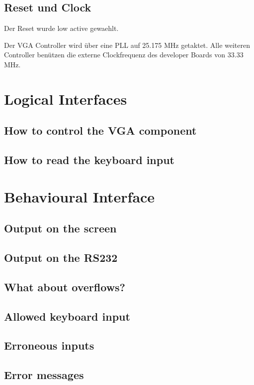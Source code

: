 \documentclass[a4paper,10pt]{scrreprt}
\begin{document}
\subsection{Reset und Clock}
Der Reset wurde low active gewaehlt.

Der VGA Controller wird über eine PLL auf 25.175 MHz getaktet. 
Alle weiteren Controller benützen die externe Clockfrequenz
des developer Boards von 33.33 MHz.

\section{Logical Interfaces}
\subsection{How to control the VGA component}

\subsection{How to read the keyboard input}


\section{Behavioural Interface}
\subsection{Output on the screen}

\subsection{Output on the RS232}

\subsection{What about overflows?}

\subsection{Allowed keyboard input}

\subsection{Erroneous inputs}

\subsection{Error messages}

\end{document}
